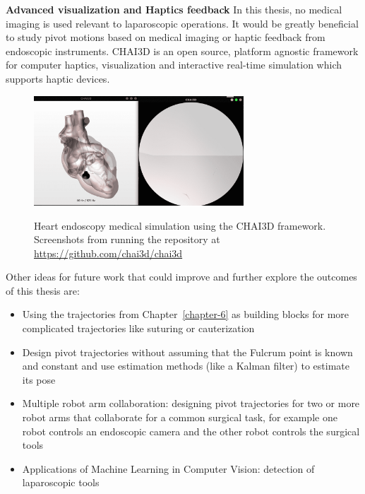 \textbf{Advanced visualization and Haptics feedback}
In this thesis, no medical imaging is used relevant to laparoscopic operations. It would be greatly beneficial to study pivot motions based on medical imaging or haptic feedback from endoscopic instruments. CHAI3D is an open source, platform agnostic framework for computer haptics, visualization and interactive real-time simulation which supports haptic devices.
%
\begin{center}
\begin{figure}[!htb]
\centering
\includegraphics[width=0.7\textwidth]{images/future-work-chai3d.png}\\
\caption{Heart endoscopy medical simulation using the CHAI3D framework. Screenshots from running the repository at
\url{https://github.com/chai3d/chai3d}}
\end{figure}
\end{center}


Other ideas for future work that could improve and further explore the outcomes of this thesis are:
\begin{itemize}
\item Using the trajectories from Chapter~\ref{chapter-6} as building blocks for more complicated trajectories like suturing or cauterization
\item Design pivot trajectories without assuming that the Fulcrum point is known and constant and use estimation methods (like a Kalman filter) to estimate its pose
\item Multiple robot arm collaboration: designing pivot trajectories for two or more robot arms that collaborate for a common surgical task, for example one robot controls an endoscopic camera and the other robot controls the surgical tools
\item Applications of Machine Learning in Computer Vision: detection of laparoscopic tools
\end{itemize}
